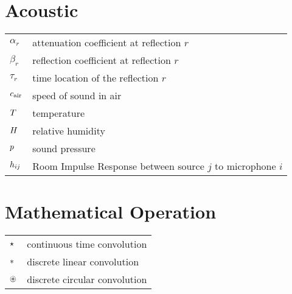 \section*{Acoustic}
\begin{table}[H]
    \begin{tabular}{ll}
        $\alpha_{r}$   & attenuation coefficient at reflection $r$\\
        $\beta_{r}$    & reflection coefficient at reflection $r$\\
        $\tau_{r}$     & time location of the reflection $r$\\
        $c_\text{air}$         & speed of sound in air\\
        $T$  & temperature\\
        $H$    & relative humidity\\
        $p$     & sound pressure\\
        $h_{ij}$     & Room Impulse Response between source $j$ to microphone $i$ \\
    \end{tabular}
\end{table}

\section*{Mathematical Operation}
\begin{table}[H]
    \begin{tabular}{ll}
        $\star$          & continuous time convolution\\
        $\ast$       & discrete linear convolution\\
        $\circledast$       & discrete circular convolution\\
    \end{tabular}
\end{table}


